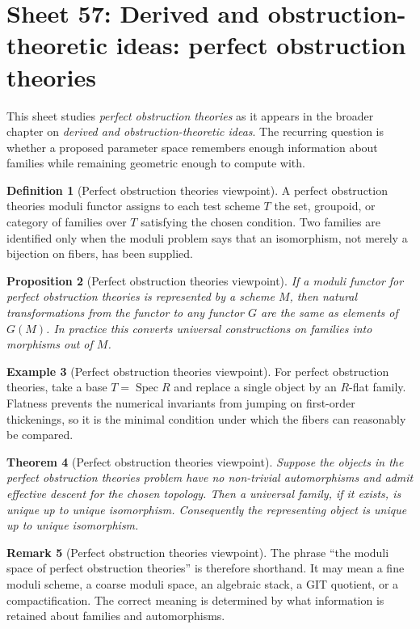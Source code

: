 \documentclass[11pt]{amsart}
\newtheorem{theorem}{Theorem}[section]
\newtheorem{proposition}[theorem]{Proposition}
\theoremstyle{definition}
\newtheorem{definition}[theorem]{Definition}
\newtheorem{example}[theorem]{Example}
\newtheorem{remark}[theorem]{Remark}
\newcommand{\Spec}{\operatorname{Spec}}
\begin{document}
\section{Sheet 57: Derived and obstruction-theoretic ideas: perfect obstruction theories}
This sheet studies \emph{perfect obstruction theories} as it appears in the broader chapter on \emph{derived and obstruction-theoretic ideas}.  The recurring question is whether a proposed parameter space remembers enough information about families while remaining geometric enough to compute with.
\begin{definition}[Perfect obstruction theories viewpoint]
A perfect obstruction theories moduli functor assigns to each test scheme $T$ the set, groupoid, or category of families over $T$ satisfying the chosen condition.  Two families are identified only when the moduli problem says that an isomorphism, not merely a bijection on fibers, has been supplied.
\end{definition}
\begin{proposition}[Perfect obstruction theories viewpoint]
If a moduli functor for perfect obstruction theories is represented by a scheme $M$, then natural transformations from the functor to any functor $G$ are the same as elements of $G(M)$.  In practice this converts universal constructions on families into morphisms out of $M$.
\end{proposition}
\begin{example}[Perfect obstruction theories viewpoint]
For perfect obstruction theories, take a base $T=\Spec R$ and replace a single object by an $R$-flat family.  Flatness prevents the numerical invariants from jumping on first-order thickenings, so it is the minimal condition under which the fibers can reasonably be compared.
\end{example}
\begin{theorem}[Perfect obstruction theories viewpoint]
Suppose the objects in the perfect obstruction theories problem have no non-trivial automorphisms and admit effective descent for the chosen topology.  Then a universal family, if it exists, is unique up to unique isomorphism.  Consequently the representing object is unique up to unique isomorphism.
\end{theorem}
\begin{remark}[Perfect obstruction theories viewpoint]
The phrase ``the moduli space of perfect obstruction theories'' is therefore shorthand.  It may mean a fine moduli scheme, a coarse moduli space, an algebraic stack, a GIT quotient, or a compactification.  The correct meaning is determined by what information is retained about families and automorphisms.
\end{remark}
\end{document}
